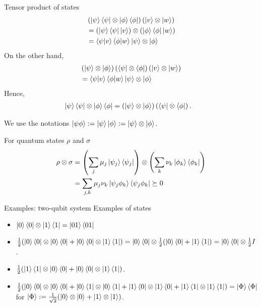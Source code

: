 \documentclass[10pt]{beamer}
\begin{document}
\begin{frame}{Tensor product of states}
\small
\begin{align*}
&\left(\ket{\psi}\bra{\psi}
\otimes
\ket{\phi}\bra{\phi}\right) \left(\ket{v}\otimes \ket{w}\right)\\
&=
\left(\ket{\psi}\bra{\psi}\ket{v}\right)\otimes
\left(\ket{\phi}\bra{\phi}\ket{w}\right)\\
&=\braket{\psi|v}\braket{\phi|w}
\ket{\psi}\otimes \ket{\phi}
\end{align*}
On the other hand,
\begin{align*}
&\left(\ket{\psi}\otimes\ket{\phi}\right)
\left(\bra{\psi}\otimes\bra{\phi}\right) \left(\ket{v}\otimes \ket{w}\right)\\
&=\braket{\psi|v}\braket{\phi|w}
\ket{\psi}\otimes \ket{\phi}
\end{align*}
Hence,
\begin{align*}
&\ket{\psi}\bra{\psi}
\otimes
\ket{\phi}\bra{\phi} =
\left(\ket{\psi}\otimes\ket{\phi}\right)
\left(\bra{\psi}\otimes\bra{\phi}\right).
\end{align*}

\vspace{1em}
We use the notations $\ket{\psi\phi}:=\ket{\psi}\ket{\phi}:=\ket{\psi}\otimes\ket{\phi}$.

For quantum states $\rho$ and $\sigma$
\begin{align*}
\rho\otimes\sigma
&=
\left(\sum_j \mu_j \ket{\psi_j}\bra{\psi_j}\right)\otimes
\left(\sum_k \nu_k \ket{\phi_k}\bra{\phi_k}\right)\\
&=\sum_{j,k}\mu_j\nu_k\ket{\psi_j\phi_k}\bra{\psi_j\phi_k}
\succeq0
\end{align*}
\end{frame}

\begin{frame}{Examples: two-qubit system}
Examples of states
\begin{itemize}
\setlength{\itemsep}{2em}
\item $\ket{0}\bra{0}\otimes \ket{1}\bra{1} = \ket{01}\bra{01}$
\item $\frac12 (\ket{0}\bra{0}\otimes \ket{0}\bra{0} + \ket{0}\bra{0}\otimes \ket{1}\bra{1}) =
 \ket{0}\bra{0}\otimes \frac12(\ket{0}\bra{0} + \ket{1}\bra{1}) = \ket{0}\bra{0}\otimes \frac12 I$.
\item $\frac12 (\ket{1}\bra{1}\otimes \ket{0}\bra{0} + \ket{0}\bra{0}\otimes \ket{1}\bra{1})$.
\item $\frac12(\ket{0}\bra{0}\otimes \ket{0}\bra{0} + \ket{0}\bra{1}\otimes \ket{0}\bra{1}  + \ket{1}\bra{0}\otimes \ket{1}\bra{0} + \ket{1}\bra{1}\otimes \ket{1}\bra{1} )
= \ket{\Phi}\bra{\Phi}$ for $\ket{\Phi}:=\frac1{\sqrt{2}}(\ket{0}\otimes\ket{0}+\ket{1}\otimes\ket{1})$.
\end{itemize}
\end{frame}
\end{document}
